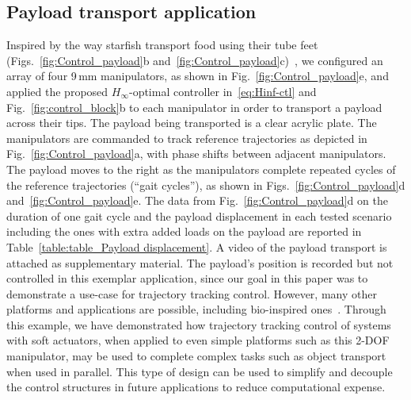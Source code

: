 \subsection{Payload transport application} \label{sec:payload}
Inspired by the way starfish transport food using their tube feet (Figs.~\ref{fig:Control_payload}b and~\ref{fig:Control_payload}c)~\cite{kerkut1953forces,pentreath1970feeding}, we configured an array of four 9\,mm manipulators, as shown in Fig.~\ref{fig:Control_payload}e, and applied the proposed $H_\infty$-optimal controller in~\eqref{eq:Hinf-ctl} and Fig.~\ref{fig:control_block}b to each manipulator in order to transport a payload across their tips. The payload being transported is a clear acrylic plate. The manipulators are commanded to track reference trajectories as depicted in Fig.~\ref{fig:Control_payload}a, with phase shifts between adjacent manipulators. The payload moves to the right as the manipulators complete repeated cycles of the reference trajectories (``gait cycles''), as shown in Figs.~\ref{fig:Control_payload}d and~\ref{fig:Control_payload}e. The data from Fig.~\ref{fig:Control_payload}d on the duration of one gait cycle and the payload displacement in each tested scenario including the ones with extra added loads on the payload are reported in Table~\ref{table:table_Payload displacement}. A video of the payload transport is attached as supplementary material. The payload's position is recorded but not controlled in this exemplar application, since our goal in this paper was to demonstrate a use-case for trajectory tracking control. However, many other platforms and applications are possible, including bio-inspired ones~\cite{doroudchi2020dynamic}. Through this example, we have demonstrated how trajectory tracking control of systems with soft actuators, when applied to even simple platforms such as this 2-DOF manipulator, may be used to complete complex tasks such as object transport when used in parallel. This type of design can be used to simplify and decouple the control structures in future applications to reduce computational expense.

